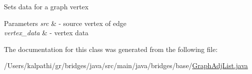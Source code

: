 Sets data for a graph vertex


\begin{DoxyParams}{Parameters}
{\em src} & -\/ source vertex of edge \\
\hline
{\em vertex\+\_\+data} & -\/ vertex data \\
\hline
\end{DoxyParams}


The documentation for this class was generated from the following file\+:\begin{DoxyCompactItemize}
\item 
/\+Users/kalpathi/gr/bridges/java/src/main/java/bridges/base/\mbox{\hyperlink{_graph_adj_list_8java}{Graph\+Adj\+List.\+java}}\end{DoxyCompactItemize}
